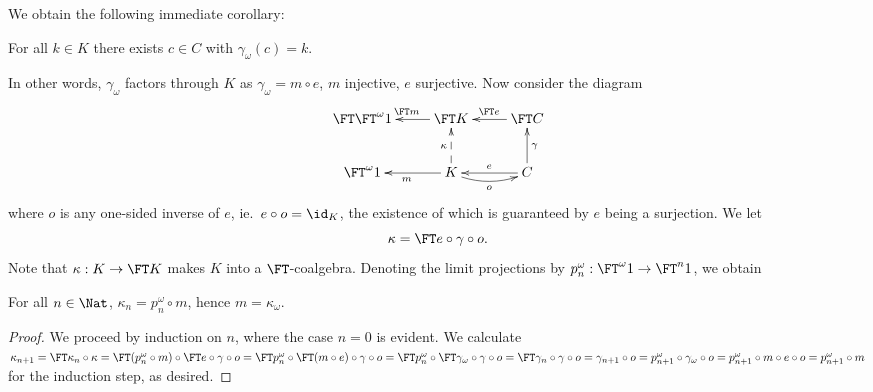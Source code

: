 \documentclass{entcs}
\begin{document}
We obtain the following immediate corollary:

\begin{cor}
For all $k \in K$ there exists $c \in C$ with $\gamma_{\omega}(c) = k$.
\end{cor}

\noindent
In other words, $\gamma_{\omega}$ factors through $K$ as $\gamma_{\omega} = m
\circ e$, $m$ injective, $e$ surjective. Now consider the diagram
%
\[\xymatrix{
  \FT \FT^{\omega} 1 & \FT K \ar[l]_{\FT m} &
  \FT C \ar[l]_{\FT e} \\
  \FT^{\omega} 1 & K \ar[l]^m \ar@{-->}[u]^{\kappa} \ar@/_/[r]_{o} & C
  \ar[l]_e \ar[u]_{\gamma} }\] 
%
where $o$ is any one-sided inverse of $e$, ie.\
$e \circ o = \id_K$, the existence of which is guaranteed by $e$ being a
surjection.  We let 
%
$$\kappa = \FT e \circ \gamma \circ o.$$
%
Note that $\kappa: K \to \FT K$ makes $K$ into a $\FT$-coalgebra.  Denoting
the limit projections by $p^{\omega}_n: \FT^{\omega} 1 \to \FT^n 1$, we obtain

\begin{lemma} \label{lemma:kappa-n}
  For all $n \in \Nat$, $\kappa_n = p^{\omega}_n \circ m$, hence
  $m=\kappa_\omega$.
\end{lemma}
%
\begin{proof}
We proceed by induction on $n$, where the case $n = 0$ is evident. We calculate
  $\kappa_{n+1}%
        = \FT \kappa_n \circ \kappa %
        = \FT(p^{\omega}_n \circ m) \circ \FT e \circ \gamma \circ o %
        = \FT p^{\omega}_n \circ \FT (m \circ e) \circ \gamma \circ o %
        = \FT p^{\omega}_n \circ \FT \gamma_{\omega} \circ \gamma \circ o %
        = \FT \gamma_n \circ \gamma \circ o %
        = \gamma_{n+1} \circ o %
        = p^{\omega}_{n+1} \circ \gamma_{\omega} \circ o %
        = p^{\omega}_{n+1} \circ m \circ e \circ o %
        = p^{\omega}_{n+1} \circ m$
for the induction step, as desired.
\end{proof}
\end{document}

